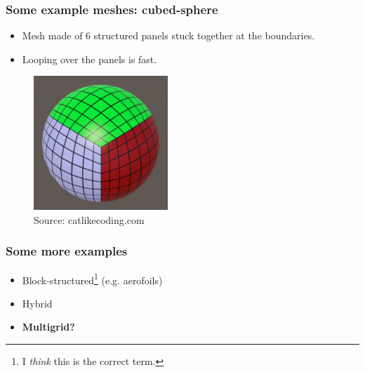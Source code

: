 \documentclass{beamer}
\begin{document}
\begin{frame}
  \frametitle{Some example meshes: cubed-sphere}

  \begin{itemize}
    \item
      Mesh made of 6 structured panels stuck together at the boundaries.
    \item
      Looping over the panels is fast.
  \end{itemize}

  \begin{figure}[b]
    \includegraphics[width=0.45\textwidth]{cubedsphere}
    \caption{Source: catlikecoding.com}
  \end{figure}
\end{frame}

\begin{frame}
  \frametitle{Some more examples}

  \begin{itemize}
    \item Block-structured\footnote{I \textit{think} this is the correct term.} (e.g. aerofoils)
    \item Hybrid
    \item \textbf{Multigrid?}
  \end{itemize}
\end{frame}
\end{document}
